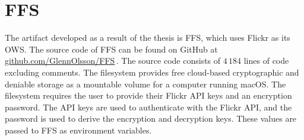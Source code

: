 \section{FFS}
\label{sec:res_ffs}
The artifact developed as a result of the thesis is \gls{FFS}, which uses Flickr as its \gls{OWS}. The source code of \gls{FFS} can be found on GitHub at \href{https://github.com/GlennOlsson/FFS}{github.com/GlennOlsson/FFS}\,\cite{olssonFejkFileSystem2022}. The source code consists of $4\,184$ lines of code excluding comments. The filesystem provides free \mbox{cloud-based} cryptographic and deniable storage as a mountable volume for a computer running macOS. The filesystem requires the user to provide their Flickr \gls{API} keys and an encryption password. The \gls{API} keys are used to authenticate with the Flickr \gls{API}, and the password is used to derive the encryption and decryption keys. These values are passed to \gls{FFS} as environment variables.